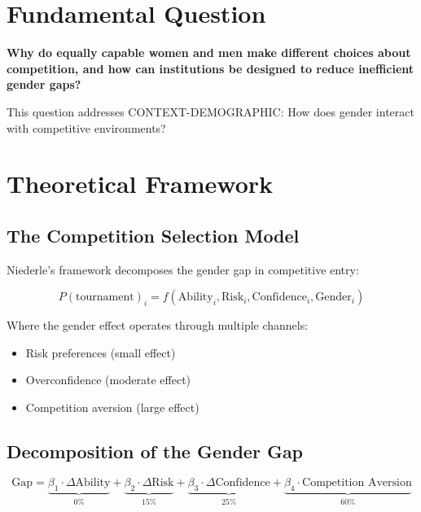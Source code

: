 \section{Fundamental Question}

\begin{tcolorbox}[colback=yellow!10!white,colframe=orange!75!black,title=Central Research Question]
\textbf{Why do equally capable women and men make different choices about competition, and how can institutions be designed to reduce inefficient gender gaps?}
\end{tcolorbox}

This question addresses CONTEXT-DEMOGRAPHIC: How does gender interact with competitive environments?

\section{Theoretical Framework}

\subsection{The Competition Selection Model}

Niederle's framework decomposes the gender gap in competitive entry:

\begin{equation}
P(\text{tournament})_i = f(\text{Ability}_i, \text{Risk}_i, \text{Confidence}_i, \text{Gender}_i)
\end{equation}

Where the gender effect operates through multiple channels:
\begin{itemize}
    \item Risk preferences (small effect)
    \item Overconfidence (moderate effect)
    \item Competition aversion (large effect)
\end{itemize}

\subsection{Decomposition of the Gender Gap}

\begin{equation}
\text{Gap} = \underbrace{\beta_1 \cdot \Delta\text{Ability}}_{0\%} + \underbrace{\beta_2 \cdot \Delta\text{Risk}}_{15\%} + \underbrace{\beta_3 \cdot \Delta\text{Confidence}}_{25\%} + \underbrace{\beta_4 \cdot \text{Competition Aversion}}_{60\%}
\end{equation}

